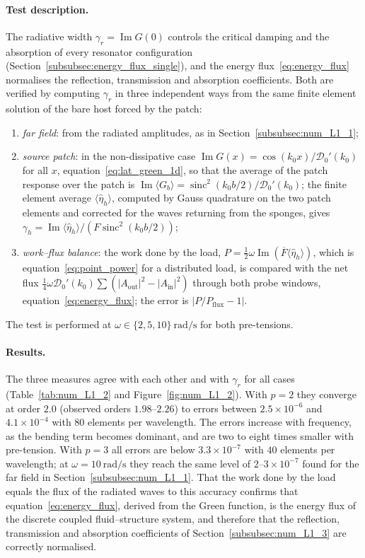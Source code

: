 {\paragraph{Test description.} The radiative width $\gamma_r=\operatorname{Im}G(0)$ controls the critical damping and the absorption of every resonator configuration (Section~\ref{subsubsec:energy_flux_single}), and the energy flux~\eqref{eq:energy_flux} normalises the reflection, transmission and absorption coefficients. Both are verified by computing $\gamma_r$ in three independent ways from the same finite element solution of the bare host forced by the patch:
\begin{enumerate}
    \item \emph{far field}: from the radiated amplitudes, as in Section~\ref{subsubsec:num_L1_1};
    \item \emph{source patch}: in the non-dissipative case $\operatorname{Im}G(x)=\cos(k_0x)/\mathcal{D}_0'(k_0)$ for all $x$, equation~\eqref{eq:lat_green_1d}, so that the average of the patch response over the patch is $\operatorname{Im}\langle G_b\rangle=\operatorname{sinc}^2(k_0b/2)/\mathcal{D}_0'(k_0)$; the finite element average $\langle\widehat{\eta}_h\rangle$, computed by Gauss quadrature on the two patch elements and corrected for the waves returning from the sponges, gives $\gamma_h=\operatorname{Im}\langle\widehat{\eta}_h\rangle/(F\operatorname{sinc}^2(k_0b/2))$;
    \item \emph{work--flux balance}: the work done by the load, $P=\tfrac12\omega\operatorname{Im}(\overline{F}\langle\widehat{\eta}_h\rangle)$, which is equation~\eqref{eq:point_power} for a distributed load, is compared with the net flux $\tfrac14\omega\mathcal{D}_0'(k_0)\sum(|A_\mathrm{out}|^2-|A_\mathrm{in}|^2)$ through both probe windows, equation~\eqref{eq:energy_flux}; the error is $|P/P_\mathrm{flux}-1|$.
\end{enumerate}
The test is performed at $\omega\in\{2,5,10\}~\si{\radian\per\second}$ for both pre-tensions.

\paragraph{Results.} The three measures agree with each other and with $\gamma_r$ for all cases (Table~\ref{tab:num_L1_2} and Figure~\ref{fig:num_L1_2}). With $p=2$ they converge at order $2.0$ (observed orders $1.98$--$2.26$) to errors between $2.5\times10^{-6}$ and $4.1\times10^{-4}$ with $80$ elements per wavelength. The errors increase with frequency, as the bending term becomes dominant, and are two to eight times smaller with pre-tension. With $p=3$ all errors are below $3.3\times10^{-7}$ with $40$ elements per wavelength; at $\omega=10~\si{\radian\per\second}$ they reach the same level of $2$--$3\times10^{-7}$ found for the far field in Section~\ref{subsubsec:num_L1_1}. That the work done by the load equals the flux of the radiated waves to this accuracy confirms that equation~\eqref{eq:energy_flux}, derived from the Green function, is the energy flux of the discrete coupled fluid--structure system, and therefore that the reflection, transmission and absorption coefficients of Section~\ref{subsubsec:num_L1_3} are correctly normalised.

}
